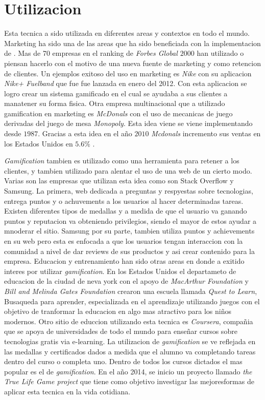 \section{Utilizacion}

Esta tecnica a sido utilizada en diferentes areas y contextos en todo el mundo. Marketing ha sido una 
de las areas que ha sido beneficiada con la implementacion de {\GAM}. Mas de 70 empresas en el ranking de 
\emph{Forbes Global $2000$} han utilizado o piensan hacerlo con el motivo de una nueva fuente de 
marketing y como retencion de clientes\cite{Gam:Util:1}. Un ejemplos exitoso del uso en marketing es \emph{Nike} 
con su aplicacion \emph{Nike+ Fuelband} que fue fue lanzada en enero del 2012\cite{Gam:Util:2}. 
Con esta aplicacion se logro crear un sistema gamificado en el cual se ayudaba a sus clientes a manatener 
su forma fisica. Otra empresa multinacional que a utilizado gamification en marketing es \emph{McDonals} 
con el uso de mecanicas de juego derivadas del juego de mesa \emph{Monopoly}. Esta idea viene se viene 
implementando desde $1987$. Gracias a esta idea en el año $2010$ \emph{Mcdonals} incremento sus ventas en los Estados
Unidos en $5.6\%$ \cite{Gam:Util:2}.

\emph{Gamification} tambien es utilizado como una herramienta para retener a los clientes, y tambien utilizado 
para alentar el uso de una web de un cierto modo. Varias son las empresas que utilizan esta idea como son 
Stack Overflow y Samsung. La primera, web dedicada a preguntas y respyestas sobre tecnologias, entrega puntos y o 
achuvements a los usuarios al hacer determinadas tareas. Existen diferentes tipos de medallas y a medida
 de que el usuario va ganando puntos y reputacion va obteniendo privilegios, siendo el mayor de estos 
ayudar a mnoderar el sitio. Samsung por su parte, tambien utiliza puntos y achievements en su web pero
 esta es enfocada a que los usuarios tengan interaccion con la comunidad a nivel de dar reviews de sus 
productos y asi crear contenido para la empresa\cite{Gam:Util:3}. 
Educacion y entrenamiento han sido otras areas en donde a exitido interes por
utilizar \emph{gamification}. En los Estados Unidos el departameto de educacion de la ciudad de neva york
 con el apoyo de \emph{MacArthur Foundation} y \emph{Bill and Melinda Gates Foundation} crearon una escuela
 llamada \emph{Quest to Learn}, Busaqueda para aprender, especializada en el aprendizaje utilizando juegos 
con el objetivo de tranformar la educacion en algo mas atractivo para los niños modernos\cite{Gam:Util:4}. Otro sitio de educcion utilizando esta tecnica 
es \emph{Coursera}, compañia que se apoya de universidades de todo el mundo para enseñar
cursos sobre tecnologias gratis via e-learning. La utilizacion de \emph{gamification}
se ve reflejada en las medallas y certificados dados a medida que el alumno va completando
tareas dentro del curso o completa uno. Dentro de todos los cursos dictados el mas popular es
el de \emph{gamification}\cite{Gam:Util:5}. En el año 2014, se inicio un proyecto llamado
\emph{the True Life Game project} que tiene como objetivo investigar las mejoresformas de
aplicar esta tecnica en la vida cotidiana.

